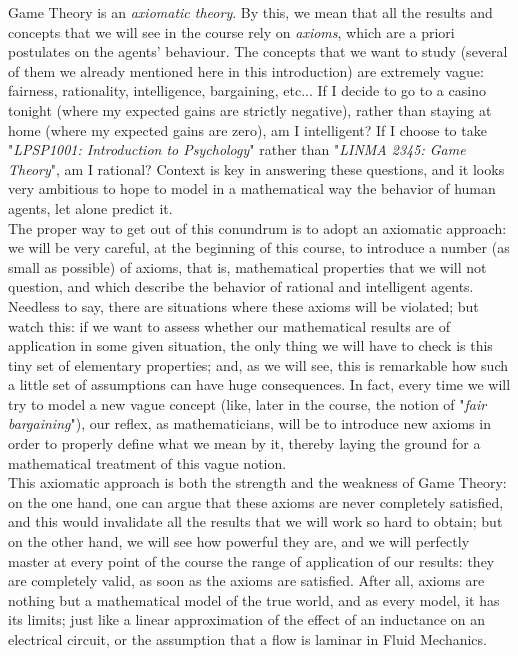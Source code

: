 Game Theory is an \emph{axiomatic theory}.  By this, we mean that all the results and concepts that we will see in the course rely on \emph{axioms}, which are a priori postulates on the agents' behaviour.  The concepts that we want to study (several of them we already mentioned here in this introduction) are extremely vague: fairness, rationality, intelligence, bargaining, etc...  If I decide to go to a casino tonight (where my expected gains are strictly negative), rather than staying at home (where my expected gains are zero), am I intelligent?  If I choose to take "\emph{LPSP1001: Introduction to Psychology}" rather than "\emph{LINMA 2345: Game Theory}", am I rational?  Context is key in answering these questions, and it looks very ambitious to hope to model in a mathematical way the behavior of human agents, let alone predict it.  \\
The proper way to get out of this conundrum is to adopt an axiomatic approach: we will be very careful, at the beginning of this course, to introduce a number (as small as possible) of axioms, that is, mathematical properties that we will not question, and which describe the behavior of rational and intelligent agents.  Needless to say, there are situations where these axioms will be violated; but watch this: if we want to assess whether our mathematical results are of application in some given situation, the only thing we will have to check is this tiny set of elementary properties; and, as we will see, this is remarkable how such a little set of assumptions can have huge consequences.  In fact, every time we will try to model a new vague concept (like, later in the course, the notion of "\emph{fair bargaining}"), our reflex, as mathematicians, will be to introduce new axioms in order to properly define what we mean by it, thereby laying the ground for a mathematical treatment of this vague notion. \\This axiomatic approach is both the strength and the weakness of Game Theory: on the one hand, one can argue that these axioms are never completely satisfied, and this would invalidate all the results that we will work so hard to obtain; but on the other hand, we will see how powerful they are, and we will perfectly master at every point of the course the range of application of our results: they are completely valid, as soon as the axioms are satisfied.  After all, axioms are nothing but a mathematical model of the true world, and as every model, it has its limits; just like a linear approximation of the effect of an inductance on an electrical circuit, or the assumption that a flow is laminar in Fluid Mechanics.



